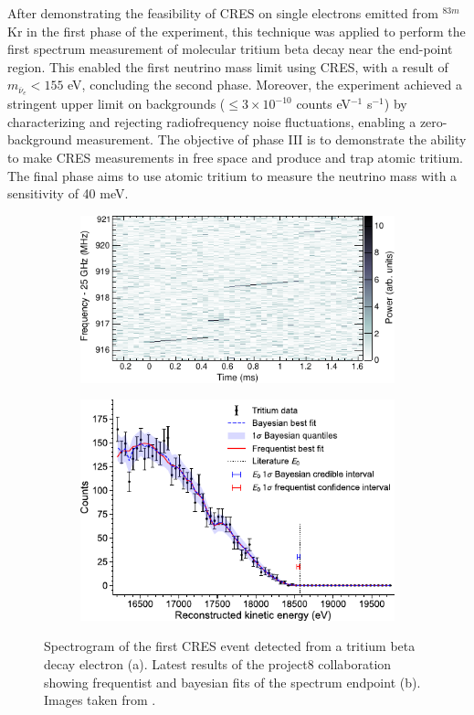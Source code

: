 After demonstrating the feasibility of CRES on single electrons emitted from $^{83m}$Kr in the first phase of the experiment,
this technique was applied to perform the first spectrum measurement of molecular tritium beta decay near the
end-point region. This enabled the first neutrino mass limit using CRES, with a result of $m_{\overline{\nu}_{e}} < 155$ eV, concluding the
second phase. Moreover, the experiment achieved a stringent upper limit on backgrounds ($\le 3 \times 10^{-10}$ counts
eV$^{-1}$ s$^{-1}$) by characterizing and rejecting radiofrequency noise fluctuations, enabling a zero-background measurement. The objective of phase III is to demonstrate the ability to make CRES measurements in free space and produce and trap atomic tritium. The final phase aims to use atomic tritium to measure the neutrino mass with a sensitivity of 40 meV.
\begin{figure}[t]
\begin{subfigure}[b]{0.5\linewidth}
    \includegraphics[width=\linewidth]{figures/ch1/p8electron.pdf}
    \caption{}
  \end{subfigure}
\hfill
\begin{subfigure}[b]{0.45\linewidth}
    \includegraphics[width=\linewidth]{figures/ch1/p8V2.pdf}
    \caption{}
  \end{subfigure}
  \caption{Spectrogram of the first CRES event detected from a
tritium beta decay electron (a). Latest results of the project8 collaboration showing frequentist and bayesian fits of
the spectrum endpoint (b). Images taken from  \cite{P8esfahani2023tritium}. }
\label{fig:p8}
\end{figure}


